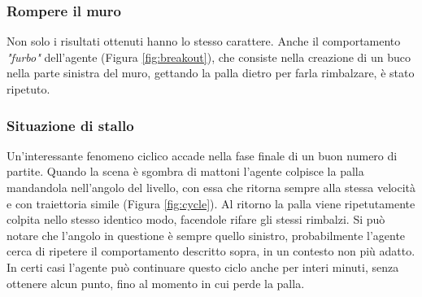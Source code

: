 \documentclass[twoside,twocolumn,10pt]{extarticle}
\theoremstyle{definition}
\begin{document}
		\subsubsection{Rompere il muro}
			Non solo i risultati ottenuti hanno lo stesso carattere. Anche il comportamento \textit{"furbo"} dell'agente (Figura \ref{fig:breakout}), che consiste nella creazione di un buco nella parte sinistra del muro, gettando la palla dietro per farla rimbalzare, è stato ripetuto.
		
		\subsubsection{Situazione di stallo}
			Un'interessante fenomeno ciclico accade nella fase finale di un buon numero di partite. Quando la scena è sgombra di mattoni l'agente colpisce la palla mandandola nell'angolo del livello, con essa che ritorna sempre alla stessa velocità e con traiettoria simile (Figura \ref{fig:cycle}). Al ritorno la palla viene ripetutamente colpita nello stesso identico modo, facendole rifare gli stessi rimbalzi. Si può notare che l'angolo in questione è sempre quello sinistro, probabilmente l'agente cerca di ripetere il comportamento descritto sopra, in un contesto non più adatto. In certi casi l'agente può continuare questo ciclo anche per interi minuti, senza ottenere alcun punto, fino al momento in cui perde la palla.
\end{document}
